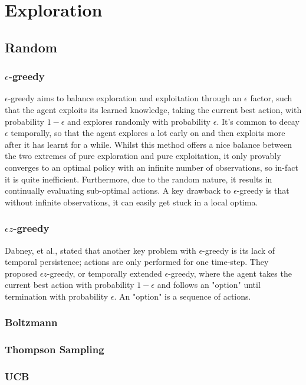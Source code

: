 \section{Exploration}
\subsection{Random}
\subsubsection{$\epsilon$-greedy}
$\epsilon$-greedy \cite{Watkins:1989, conf/nips/Sutton95} aims to balance exploration and exploitation through an $\epsilon$ factor, such that the agent exploits its learned knowledge, taking the current best action, with probability $1-\epsilon$ and explores randomly with probability $\epsilon$. It's common to decay $\epsilon$ temporally, so that the agent explores a lot early on and then exploits more after it has learnt for a while. Whilst this method offers a nice balance between the two extremes of pure exploration and pure exploitation, it only provably converges to an optimal policy with an infinite number of observations, so in-fact it is quite inefficient. Furthermore, due to the random nature, it results in continually evaluating sub-optimal actions. A key drawback to $\epsilon$-greedy is that without infinite observations, it can easily get stuck in a local optima.
\subsubsection{$\epsilon z$-greedy}
Dabney, et al., \cite{dabney2021temporallyextended} stated that another key problem with $\epsilon$-greedy is its lack of temporal persistence; actions are only performed for one time-step. They proposed $\epsilon z$-greedy, or temporally extended $\epsilon$-greedy, where the agent takes the current best action with probability $1-\epsilon$ and follows an "option" until termination with probability $\epsilon$. An "option" is a sequence of actions.
\subsubsection{Boltzmann}
\subsubsection{Thompson Sampling}
\subsubsection{UCB}
